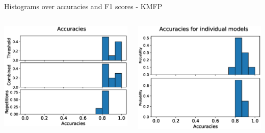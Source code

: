 \begin{frame}[fragile]{Histograms over accuracies and F1 scores - KMFP}
  \vspace{0.2cm}
  \begin{columns}
  \includegraphics[width=\textwidth]{files/figs/res/kmfp/acc.eps}

  \includegraphics[width=\textwidth]{files/figs/res/kmfp/acc-ind.eps}


\end{columns}
\end{frame}
